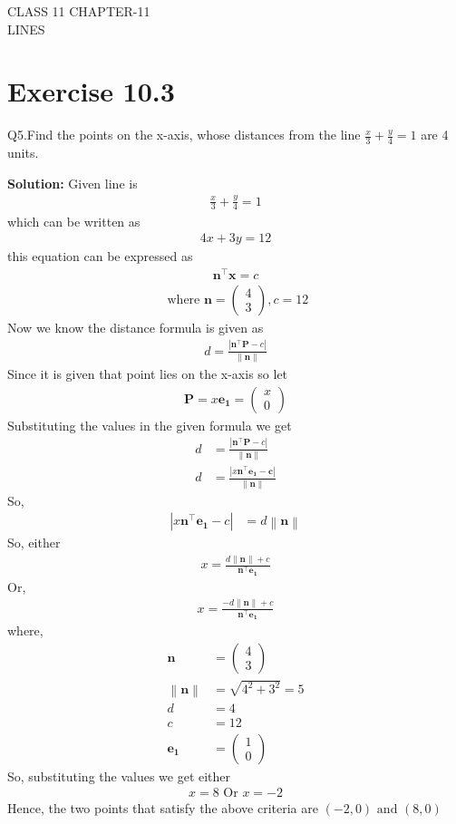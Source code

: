 \documentclass[12pt]{article}
\providecommand{\brak}[1]{\ensuremath{\left(#1\right)}}
\providecommand{\norm}[1]{\left\lVert#1\right\rVert}
\newcommand{\solution}{\noindent \textbf{Solution: }}
\newcommand{\myvec}[1]{\ensuremath{\begin{pmatrix}#1\end{pmatrix}}}
\providecommand{\abs}[1]{\left\vert#1\right\vert}
\let\vec\mathbf
\begin{document}
\begin{center}
\textbf\large{CLASS 11 CHAPTER-11 \\ LINES}

\end{center}
\section*{Exercise 10.3}

Q5.Find the points on the x-axis, whose distances from the line $\frac{x}{3}+\frac{y}{4}=1$ are 4 units.

\solution
Given line is 
\begin{align}
	\frac{x}{3}+\frac{y}{4}=1
\end{align}
which can be written as
\begin{align}
	4x+3y=12
\end{align}
this equation can be expressed as 
\begin{align}
	\vec{n}^{\top}\vec{x}=c
\end{align}
\begin{align}
	\text{ where }
		\vec{n} = \myvec{4\\3} , c = 12
\end{align}
Now we know the distance formula is given as
\begin{align}
	d = \frac{\abs{\vec{n}^\top\vec{P}-c}}{\norm{\vec{n}}}
\end{align}
Since it is given that point lies on the x-axis so let
\begin{align}
	\vec{P} = x\vec{e_{1}} = \myvec{x\\0}
\end{align}
Substituting the values in the given formula we get
\begin{align}
	d &= \frac{\abs{\vec{n}^\top\vec{P}-c}}{\norm{\vec{n}}}\\
	d &= \frac{\abs{x\vec{n}^\top\vec{e_{1}-c}}}{\norm{\vec{n}}}
\end{align}
So,
\begin{align}
	\abs{x\vec{n}^\top\vec{e_{1}}-c} &= d\norm{\vec{n}}
\end{align}
So, either
\begin{align}
	x = \frac{d\norm{\vec{n}}+c}{\vec{n}^\top\vec{e_{1}}}
\end{align}
Or,
\begin{align}
	x = \frac{-d\norm{\vec{n}}+c}{\vec{n}^\top\vec{e_{1}}}
\end{align}
where,
\begin{align}
	\vec{n} &= \myvec{4\\3}\\
	\norm{\vec{n}} &= \sqrt{4^2+3^2} = 5\\
	d &= 4\\
	c &= 12\\
	\vec{e_{1}} &= \myvec{1\\0}
\end{align}
So, substituting the values we get either
\begin{align}
	x = 8
	\text{ Or }
	x = -2
\end{align}
Hence, the two points that satisfy the above criteria are $\brak{-2,0} \text{ and } \brak{8,0}$	
\end{document}
